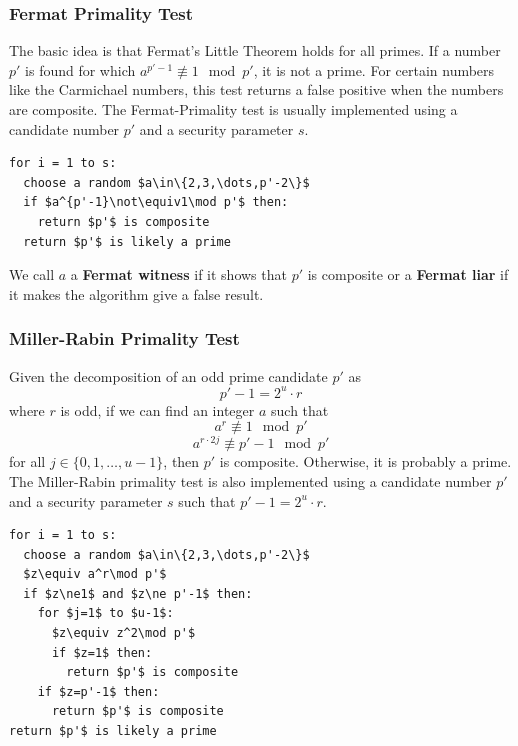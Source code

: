 \documentclass{math}
\begin{document}
\subsubsection*{Fermat Primality Test}
The basic idea is that Fermat's Little Theorem holds for all primes. If a
number \( p' \) is found for which \( a^{p'-1}\not\equiv1\mod p' \), it is not a
prime. For certain numbers like the Carmichael numbers, this test returns a
false positive when the numbers are composite. The Fermat-Primality test is
usually implemented using a candidate number \( p' \) and a security parameter
\( s \).
\begin{lstlisting}[mathescape=true]
for i = 1 to s:
  choose a random $a\in\{2,3,\dots,p'-2\}$
  if $a^{p'-1}\not\equiv1\mod p'$ then:
    return $p'$ is composite
  return $p'$ is likely a prime
\end{lstlisting}
We call \( a \) a \textbf{Fermat witness} if it shows that \( p' \) is composite
or a \textbf{Fermat liar} if it makes the algorithm give a false result.

\subsubsection*{Miller-Rabin Primality Test}
Given the decomposition of an odd prime candidate \( p' \) as
\[ p'-1 = 2^u\cdot r \]
where \( r \) is odd, if we can find an integer \( a \) such that
\[ a^r\not\equiv1\mod p' \]
\[ a^{r\cdot2j}\not\equiv p'-1\mod p' \]
for all \( j\in\{0,1,\dots,u-1\} \), then \( p' \) is composite. Otherwise, it
is probably a prime. The Miller-Rabin primality test is also implemented
using a candidate number \( p' \) and a security parameter \( s \) such that
\( p'-1 = 2^u\cdot r \).
\begin{lstlisting}[mathescape=true]
for i = 1 to s:
  choose a random $a\in\{2,3,\dots,p'-2\}$
  $z\equiv a^r\mod p'$
  if $z\ne1$ and $z\ne p'-1$ then:
    for $j=1$ to $u-1$:
      $z\equiv z^2\mod p'$
      if $z=1$ then:
        return $p'$ is composite
    if $z=p'-1$ then:
      return $p'$ is composite
return $p'$ is likely a prime
\end{lstlisting}
\end{document}
